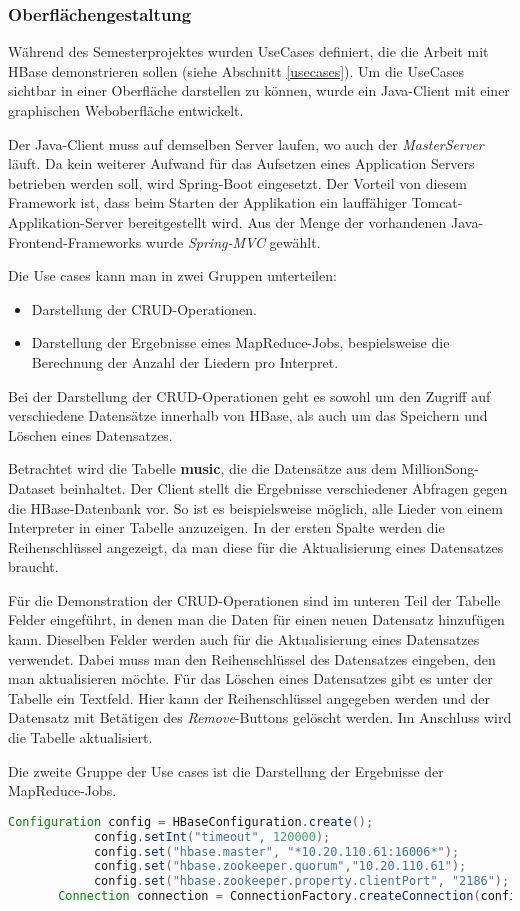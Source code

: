 \subsubsection{Oberflächengestaltung}

Während des Semesterprojektes wurden UseCases definiert, die die Arbeit mit  HBase demonstrieren sollen (siehe Abschnitt \ref{usecases}).
Um die UseCases sichtbar in einer Oberfläche darstellen zu können, wurde ein Java-Client mit einer graphischen Weboberfläche entwickelt.

Der Java-Client muss auf demselben Server laufen, wo auch der \textit{MasterServer} läuft. Da kein weiterer Aufwand für das Aufsetzen eines Application Servers betrieben werden soll, wird Spring-Boot eingesetzt. Der Vorteil von diesem Framework ist, dass beim Starten der Applikation ein lauffähiger Tomcat-Applikation-Server bereitgestellt wird. 
Aus der Menge der vorhandenen Java-Frontend-Frameworks wurde \textit{Spring-MVC} gewählt.  

Die Use cases kann man in zwei Gruppen unterteilen:
\begin{itemize}
\item Darstellung der \ac{CRUD}-Operationen.
\item Darstellung der Ergebnisse eines MapReduce-Jobs, bespielsweise die Berechnung der Anzahl der Liedern pro Interpret.
\end{itemize}
Bei der Darstellung der \ac{CRUD}-Operationen geht es sowohl um den Zugriff auf verschiedene Datensätze innerhalb von HBase, als auch um das Speichern und Löschen eines Datensatzes.

Betrachtet wird die Tabelle \textbf{music}, die die Datensätze aus dem MillionSong-Dataset beinhaltet.
Der Client stellt die Ergebnisse verschiedener Abfragen gegen die HBase-Datenbank vor. So ist es beispielsweise möglich, alle Lieder von einem Interpreter in einer Tabelle anzuzeigen. In der ersten Spalte werden die Reihenschlüssel angezeigt, da man diese für die Aktualisierung eines Datensatzes braucht.

Für die Demonstration der \ac{CRUD}-Operationen sind im unteren Teil der Tabelle Felder eingeführt, in denen man die Daten für einen neuen Datensatz hinzufügen kann. Dieselben Felder werden auch für die Aktualisierung eines Datensatzes verwendet. Dabei muss man den Reihenschlüssel des Datensatzes eingeben, den man aktualisieren möchte.
Für das Löschen eines Datensatzes gibt es unter der Tabelle ein Textfeld. Hier kann der Reihenschlüssel angegeben werden und der Datensatz mit Betätigen des \textit{Remove}-Buttons gelöscht werden. Im Anschluss wird die Tabelle aktualisiert.

Die zweite Gruppe der Use cases ist die Darstellung der Ergebnisse der MapReduce-Jobs.
\begin{lstlisting}[language=Java]
Configuration config = HBaseConfiguration.create();
            config.setInt("timeout", 120000);
            config.set("hbase.master", "*10.20.110.61:16006*");
            config.set("hbase.zookeeper.quorum","10.20.110.61");
            config.set("hbase.zookeeper.property.clientPort", "2186");
	   Connection connection = ConnectionFactory.createConnection(config);
\end{lstlisting}
